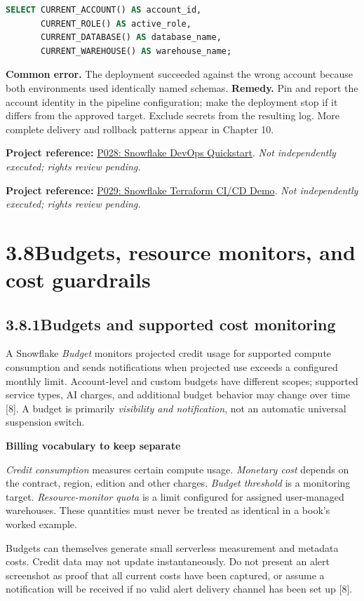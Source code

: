 \documentclass[11pt,twoside]{article}
\newcommand{\topic}[2]{\subsection*{#1\quad #2}}
\newcommand{\repo}[2]{\par\begingroup\fontsize{8.0}{9.6}\selectfont\sffamily\color{inkgray}\textbf{Project reference:} \href{#2}{#1}. \textit{Not independently executed; rights review pending.}\par\endgroup}
\begin{document}
\begin{lstlisting}[language=SQL,caption={A safe, read-only preflight query; check results before running DDL.}]
SELECT CURRENT_ACCOUNT() AS account_id,
       CURRENT_ROLE() AS active_role,
       CURRENT_DATABASE() AS database_name,
       CURRENT_WAREHOUSE() AS warehouse_name;
\end{lstlisting}
\textbf{Common error.} The deployment succeeded against the wrong account because both environments used identically named schemas. \textbf{Remedy.} Pin and report the account identity in the pipeline configuration; make the deployment stop if it differs from the approved target. Exclude secrets from the resulting log. More complete delivery and rollback patterns appear in Chapter 10.
\repo{P028: Snowflake DevOps Quickstart}{https://github.com/Snowflake-Labs/sfguide-getting-started-with-snowflake-devops}
\repo{P029: Snowflake Terraform CI/CD Demo}{https://github.com/sfc-gh-sekim/cicd-snowflake-with-terraform-demo}

\newpage
\section*{3.8\quad Budgets, resource monitors, and cost guardrails}
\topic{3.8.1}{Budgets and supported cost monitoring}
A Snowflake \emph{Budget} monitors projected credit usage for supported compute consumption and sends notifications when projected use exceeds a configured monthly limit. Account-level and custom budgets have different scopes; supported service types, AI charges, and additional budget behavior may change over time [8]. A budget is primarily \emph{visibility and notification}, not an automatic universal suspension switch.

\begin{whitebox}
\textbf{Billing vocabulary to keep separate}\par
\emph{Credit consumption} measures certain compute usage. \emph{Monetary cost} depends on the contract, region, edition and other charges. \emph{Budget threshold} is a monitoring target. \emph{Resource-monitor quota} is a limit configured for assigned user-managed warehouses. These quantities must never be treated as identical in a book's worked example.
\end{whitebox}
Budgets can themselves generate small serverless measurement and metadata costs. Credit data may not update instantaneously. Do not present an alert screenshot as proof that all current costs have been captured, or assume a notification will be received if no valid alert delivery channel has been set up [8].
\end{document}
